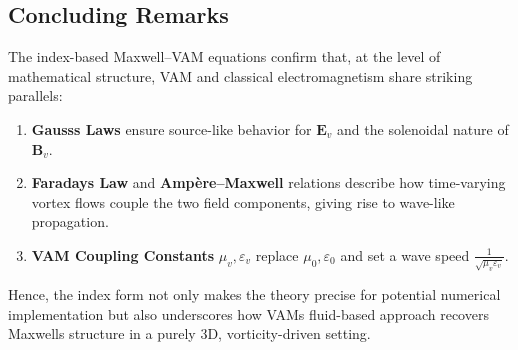 \subsection{Concluding Remarks}

The index-based Maxwell--VAM equations confirm that, at the level of mathematical structure, VAM and classical electromagnetism share striking parallels:

\begin{enumerate}
    \item \textbf{Gauss\rqs s Laws} ensure source-like behavior for \(\mathbf{E}_v\) and the solenoidal nature of \(\mathbf{B}_v\).
    \item \textbf{Faraday\rqs s Law} and \textbf{Ampère--Maxwell} relations describe how time-varying vortex flows couple the two field components, giving rise to wave-like propagation.
    \item \textbf{VAM Coupling Constants} \(\mu_v, \varepsilon_v\) replace \(\mu_0, \varepsilon_0\) and set a wave speed \(\frac{1}{\sqrt{\mu_v\varepsilon_v}}\).
\end{enumerate}

Hence, the index form not only makes the theory precise for potential numerical implementation but also underscores how VAM\rqs s fluid-based approach recovers Maxwell\rqs s structure in a purely 3D, vorticity-driven setting.